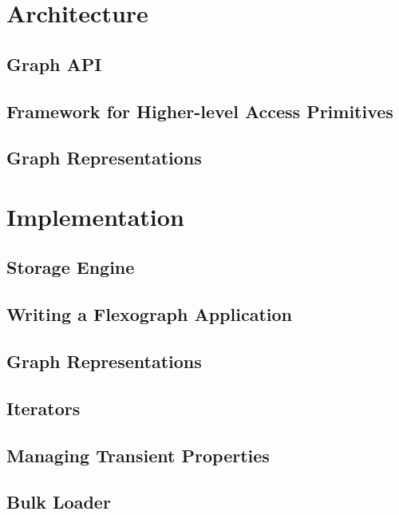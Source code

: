 \section{Architecture}
\subsection{Graph API}
\subsection{Framework for Higher-level Access Primitives}
\subsection{Graph Representations}

\section{Implementation}
\subsection{Storage Engine}
\subsection{Writing a Flexograph Application}
\subsection{Graph Representations}
\subsection{Iterators}
\subsection{Managing Transient Properties}
\subsection{Bulk Loader}